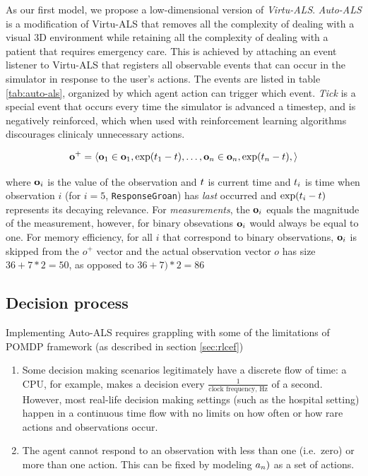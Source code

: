 As our first model, we propose a low-dimensional version of \emph{Virtu-ALS}.
\emph{Auto-ALS} is a modification of Virtu-ALS that removes all the complexity of dealing with a visual 3D environment while retaining all the complexity of dealing with a patient that requires emergency care.
This is achieved by attaching an event listener to Virtu-ALS that registers all observable events that can occur in the simulator in response to the user's actions.
The events are listed in table \ref{tab:auto-als}, organized by which agent action can trigger which event.
\emph{Tick} is a special event that occurs every time the simulator is advanced a timestep, and is negatively reinforced, which when used with reinforcement learning algorithms discourages clinicaly unnecessary actions.

\begin{equation}
     \mathbf{o}^{+} = \langle \mathbf{o}_1 \in \mathbf{o}_1, \exp(t_1-t), \dots, \mathbf{o}_n \in \mathbf{o}_n, \exp(t_n-t), \rangle
\end{equation}

where $\mathbf{o}_i$ is the value of the observation and $t$ is current time and $t_i$ is time when observation $i$ (for $i=5$, \verb|ResponseGroan|) has \emph{last} occurred and $\exp(t_i-t)$ represents its decaying relevance.
For \emph{measurements}, the $\mathbf{o}_i$ equals the magnitude of the measurement, however, for binary obsevations $\mathbf{o}_i$ would always be equal to one.
For memory efficiency, for all $i$ that correspond to binary observations, $\mathbf{o}_i$ is skipped from the $o^{+} $ vector and the actual observation vector $o$ has size $36+7*2=50$, as opposed to $36+7)*2=86$

\newpage
\subsection{Decision process}
\label{sec:mpdp}

Implementing Auto-ALS requires grappling with some of the limitations of POMDP framework (as described in section \ref{sec:rlcef})
\begin{enumerate}
    \item Some decision making scenarios legitimately have a discrete flow of time: a CPU, for example, makes a decision every $\frac{1}{\text{clock frequency, Hz}}$ of a second. However, most real-life decision making settings (such as the hospital setting) happen in a continuous time flow with no limits on how often or how rare actions and observations occur.
    \item The agent cannot respond to an observation with less than one (i.e.~zero) or more than one action. This can be fixed by modeling $a_n)$ as a set of actions.
\end{enumerate}

